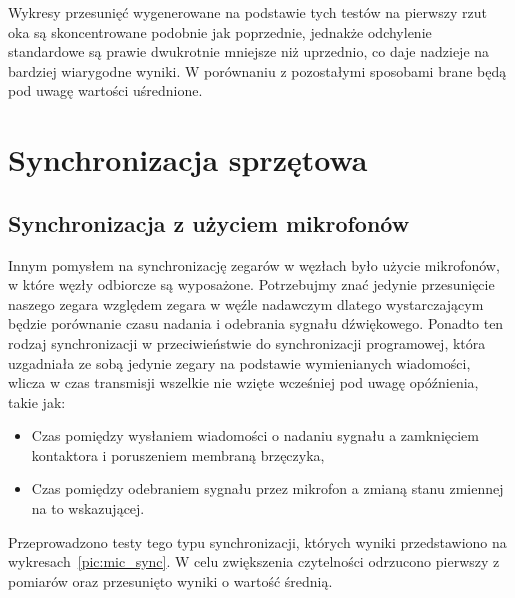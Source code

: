 Wykresy przesunięć wygenerowane na podstawie tych testów na pierwszy rzut oka są skoncentrowane podobnie jak poprzednie, jednakże odchylenie standardowe są prawie dwukrotnie mniejsze niż uprzednio, co daje nadzieje na bardziej wiarygodne wyniki. W porównaniu z pozostałymi sposobami brane będą pod uwagę wartości uśrednione.

\section{Synchronizacja sprzętowa}



\subsection{Synchronizacja z użyciem mikrofonów}\label{sec:mic_sync}

Innym pomysłem na synchronizację zegarów w węzłach było użycie mikrofonów, w które węzły odbiorcze są wyposażone. Potrzebujmy znać jedynie przesunięcie naszego zegara względem zegara w węźle nadawczym dlatego wystarczającym będzie porównanie czasu nadania i odebrania sygnału dźwiękowego. Ponadto ten rodzaj synchronizacji w przeciwieństwie do synchronizacji programowej, która uzgadniała ze sobą jedynie zegary na podstawie wymienianych wiadomości, wlicza w czas transmisji wszelkie nie wzięte wcześniej pod uwagę opóźnienia, takie jak:

\begin{itemize}
    \item Czas pomiędzy wysłaniem wiadomości o nadaniu sygnału a zamknięciem kontaktora i poruszeniem membraną brzęczyka,
    \item Czas pomiędzy odebraniem sygnału przez mikrofon a zmianą stanu zmiennej na to wskazującej.
\end{itemize}

Przeprowadzono testy tego typu synchronizacji, których wyniki przedstawiono na wykresach~\ref{pic:mic_sync}. W celu zwiększenia czytelności odrzucono pierwszy z pomiarów oraz przesunięto wyniki o wartość średnią.

